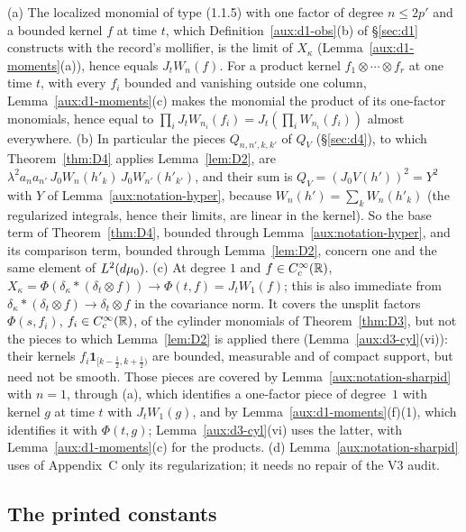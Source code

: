 \begin{auxrem}\label{aux:notation-sharpidrem}
(a) The localized monomial of type (1.1.5) with one factor of degree $n\le2p'$ and a bounded
kernel $f$ at time $t$, which Definition~\ref{aux:d1-obs}(b) of \S\ref{sec:d1} constructs with the
record's mollifier, is the limit of $X_\kappa$ (Lemma~\ref{aux:d1-moments}(a)), hence equals
$J_tW_n(f)$.  For a product kernel $f_1\otimes\cdots\otimes f_r$ at one time $t$, with every $f_i$
bounded and vanishing outside one column, Lemma~\ref{aux:d1-moments}(c) makes the monomial the
product of its one-factor monomials, hence equal to
$\prod_iJ_tW_{n_i}(f_i)=J_t(\prod_iW_{n_i}(f_i))$ almost everywhere.
(b) In particular the pieces $Q_{n,n',k,k'}$ of $Q_V$ (\S\ref{sec:d4}), to which
Theorem~\ref{thm:D4} applies Lemma~\ref{lem:D2}, are
$\lambda^2a_na_{n'}\,J_0W_n(h'_k)\,J_0W_{n'}(h'_{k'})$, and their sum is $Q_V=(J_0V(h'))^2=Y^2$ with
$Y$ of Lemma~\ref{aux:notation-hyper}, because $W_n(h')=\sum_kW_n(h'_k)$ (the regularized integrals,
hence their limits, are linear in the kernel).  So the base term of Theorem~\ref{thm:D4}, bounded
through Lemma~\ref{aux:notation-hyper}, and its comparison term, bounded through
Lemma~\ref{lem:D2}, concern one and the same element of $L^2(d\mu_0)$.
(c) At degree $1$ and $f\in C_c^\infty(\mathbb{R})$, $X_\kappa=\Phi(\delta_\kappa*(\delta_t\otimes f))\to
\Phi(t,f)=J_tW_1(f)$; this is also immediate from $\delta_\kappa*(\delta_t\otimes f)\to
\delta_t\otimes f$ in the covariance norm.  It covers the unsplit factors $\Phi(s,f_i)$,
$f_i\in C_c^\infty(\mathbb{R})$, of the cylinder monomials of Theorem~\ref{thm:D3}, but not the pieces to
which Lemma~\ref{lem:D2} is applied there (Lemma~\ref{aux:d3-cyl}(vi)): their kernels
$f_i\mathbf 1_{[k-\frac12,k+\frac12)}$ are bounded, measurable and of compact support, but need
not be smooth.  Those pieces are covered by Lemma~\ref{aux:notation-sharpid} with $n=1$, through
(a), which identifies a one-factor piece of degree~$1$ with kernel $g$ at time $t$ with
$J_tW_1(g)$, and by Lemma~\ref{aux:d1-moments}(f)(1), which identifies it with $\Phi(t,g)$;
Lemma~\ref{aux:d3-cyl}(vi) uses the latter, with Lemma~\ref{aux:d1-moments}(c) for the
products.
(d) Lemma~\ref{aux:notation-sharpid} uses of Appendix~C only its regularization; it needs no repair
of the V3 audit.
\end{auxrem}

\subsection{The printed constants}\label{sec:notation-printed}

